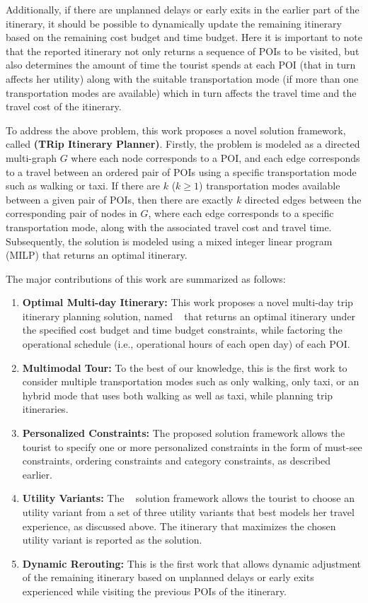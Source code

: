 Additionally, if there are unplanned delays or early exits in the earlier part of the itinerary, it should be possible to dynamically update the remaining itinerary based on the remaining cost budget and time budget. Here it is important to note that the reported itinerary not only returns a sequence of POIs to be visited, but also determines the amount of time the tourist spends at each POI (that in turn affects her utility) along with the suitable transportation mode (if more than one transportation modes are available) which in turn affects the travel time and the travel cost of the itinerary.

To address the above problem, this work proposes a novel solution framework,  called \textbf{\trip (TRip Itinerary Planner)}.  Firstly, the problem is modeled as a directed multi-graph $G$ where each node corresponds to a POI, and each edge corresponds to a travel between an ordered pair of POIs using a specific transportation mode such as walking or taxi. If there are $k$ ($k \ge 1$) transportation modes available between a given pair of POIs, then there are exactly $k$ directed edges between the corresponding pair of nodes in $G$, where each edge corresponds to a specific transportation mode, along with the associated travel cost and travel time. Subsequently, the solution is modeled using a mixed integer linear program (MILP) that returns an optimal itinerary.

The major contributions of this work are summarized as follows:
%
\begin{enumerate}
\item \textbf{Optimal Multi-day Itinerary:} This work proposes a novel multi-day trip itinerary planning solution, named \trip~ that returns an optimal itinerary under the specified cost budget and time budget constraints, while factoring the operational schedule (i.e., operational hours of each open day) of each POI.
\item \textbf{Multimodal Tour:} To the best of our knowledge, this is the first work to consider multiple transportation modes such as only walking, only taxi, or an hybrid mode that uses both walking as well as taxi, while planning trip itineraries.
\item \textbf{Personalized Constraints:} The proposed solution framework allows the tourist to specify one or more personalized constraints in the form of must-see constraints, ordering constraints and category constraints, as described earlier.
\item \textbf{Utility Variants:} The \trip~ solution framework allows the tourist to choose an utility variant from a set of three utility variants that best models her travel experience, as discussed above. The itinerary that maximizes the chosen utility variant is reported as the solution.
\item \textbf{Dynamic Rerouting:} This is the first work that allows dynamic adjustment of the remaining itinerary based on unplanned delays or early exits experienced while visiting the previous POIs of the itinerary.
%
\end{enumerate}

